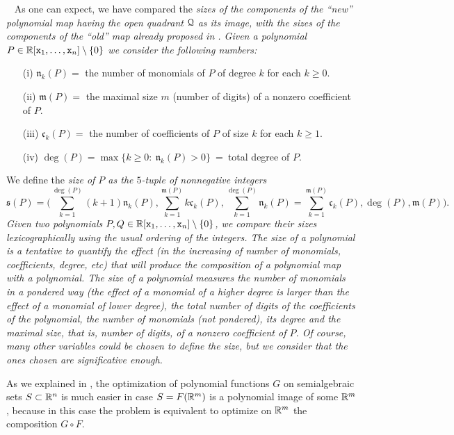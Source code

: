 \documentclass[11pt,a4paper]{amsart}
\theoremstyle{definition}
\theoremstyle{remark}
\newenvironment{stepsb}{%
\refstepcounter{theor}\noindent{\bf (\thetheor)\ }\ }%
{\em}
\newcommand{\Qq}{{\EuScript Q}}
\newcommand{\size}{\mathfrak{s}}
\newcommand{\x}{{\tt x}} \newcommand{\y}{{\tt y}}
\begin{document}
\vspace{2mm}
\begin{stepsb}\label{size}
As one can expect, we have compared the \em sizes \em of the components of the ``new'' polynomial map having the open quadrant $\Qq$ as its image, with the \em sizes \em of the components of the ``old'' map already proposed in \cite{fg1}. Given a polynomial $P\in\R[\x_1,\ldots,\x_n]\setminus\{0\}$ we consider the following numbers:
\begin{itemize}
\item[(i)] ${\mathfrak n}_k(P)=$ the number of monomials of $P$ of degree $k$ for each $k\geq0$.
\item[(ii)] ${\mathfrak m}(P)=$ the maximal size $m$ (number of digits) of a nonzero coefficient of $P$.
\item[(iii)] ${\mathfrak c}_k(P)=$ the number of coefficients of $P$ of size $k$ for each $k\geq 1$.
\item[(iv)] $\deg(P)=\max\{k\geq0:\ {\mathfrak n}_k(P)>0\}$\ =\ total degree of $P$. 
\end{itemize} 
We define the \em size \em of $P$ as the $5$-tuple of nonnegative integers
$$
\size(P)=\Big(\sum_{k=1}^{\deg(P)}(k+1){\mathfrak n}_k(P),\sum_{k=1}^{{\mathfrak m}(P)}k{\mathfrak c}_k(P),\sum_{k=1}^{\deg(P)}{\mathfrak n}_k(P)=\sum_{k=1}^{{\mathfrak m}(P)}{\mathfrak c}_k(P), \deg(P),{\mathfrak m}(P)\Big).
$$
Given two polynomials $P,Q\in\R[\x_1,\ldots,\x_n]\setminus\{0\}$, we compare their sizes lexicographically using the usual ordering of the integers. The size of a polynomial is a tentative to quantify the effect (in the increasing of number of monomials, coefficients, degree, etc) that will produce the composition of a polynomial map with a polynomial. The size of a polynomial measures the number of monomials in a pondered way (the effect of a monomial of a higher degree is larger than the effect of a monomial of lower degree), the total number of digits of the coefficients of the polynomial, the number of monomials (not pondered), its degree and the maximal size, that is, number of digits, of a nonzero coefficient of $P$. Of course, many other variables could be chosen to define the size, but we consider that the ones chosen are significative enough. 
\end{stepsb}

\vspace{2mm}
As we explained in \cite{fg2}, the optimization of polynomial functions $G$ on semialgebraic sets $S\subset{\mathbb R}^n$ is much easier in case $S=F({\mathbb R}^m)$ is a polynomial image of some ${\mathbb R}^m$, because in this case the problem is equivalent to optimize on ${\mathbb R}^m$ the composition $G\circ F$.
\end{document}
